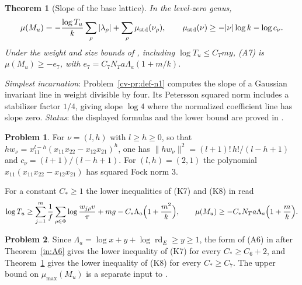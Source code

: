 \documentclass[reqno]{amsart}
\theoremstyle{definition}
\newtheorem{problem}{Problem}[section]
\theoremstyle{plain}
\newtheorem{theorem}{Theorem}[section]
\newcommand{\rd}{\operatorname{rd}}
\begin{document}
\begin{theorem}[Slope of the base lattice]\label{in:A7}
In the level-zero genus,
\[
 \mu(M_u)=-\frac{\log T_u}{k}\sum_\rho |\lambda_\rho|
             +\sum_\rho\mu_{\rm std}(\nu_\rho),\qquad
 \mu_{\rm std}(\nu)\ge-|\nu|\log k-\log c_\nu .
\]
Under the weight and size bounds of \cite[Thm.~15.33]{Adr}, including
$\log T_u\le C_Tmy$, (A7) is $\mu(M_u)\ge-e_7$, with
$e_7=C_7 N_T a\Lambda_a(1+m/k)$.
\end{theorem}
\noindent\emph{Simplest incarnation}: Problem~\ref{cv-pr:def-n1} computes the slope
of a Gaussian invariant line in weight divisible by four.  Its
Petersson squared norm includes a stabilizer factor $1/4$, giving
slope $\log4$ where the normalized coefficient line has slope zero.  \emph{Status}: the displayed formulas and the lower
bound are proved in \cite[Props.~15.30, 15.32, Thm.~15.33]{Adr}.

\begin{problem}\label{pr:hook}
For $\nu=(l,h)$ with $l\ge h\ge0$, so that
$hw_\nu=x_{11}^{l-h}(x_{11}x_{22}-x_{12}x_{21})^h$,
one has $\|hw_\nu\|^2=(l+1)!\,h!/(l-h+1)$ and $c_\nu=(l+1)/(l-h+1)$.
For $(l,h)=(2,1)$ the polynomial
$x_{11}(x_{11}x_{22}-x_{12}x_{21})$ has squared Fock norm $3$.
\end{problem}

For a constant $C_*\ge1$ the lower inequalities of (K7) and (K8) in
\cite[Def.~18.9]{Adr} read
\[
 \log T_u\ge\sum_{j=1}^m\frac1f\sum_{\rho\in\Phi}\log\frac{w_{j\rho}v}{\pi}
   +mg-C_*\Lambda_a\Bigl(1+\frac{m^2}k\Bigr),
 \qquad
 \mu(M_u)\ge-C_*N_Ta\Lambda_a\Bigl(1+\frac mk\Bigr).
\]

\begin{problem}\label{pr:record}
Since $\Lambda_a=\log x+y+\log\rd_E\ge y\ge1$, the form of (A6) in
\cite{Adr} after Theorem~\ref{in:A6} gives the lower inequality of (K7)
for every $C_*\ge C_6+2$, and Theorem~\ref{in:A7} gives the lower
inequality of (K8) for every $C_*\ge C_7$.
The upper bound on $\mu_{\max}(M_u)$ is a separate input to
\cite[Prop.~18.11(viii), Rem.~15.34]{Adr}.
\end{problem}
\end{document}
